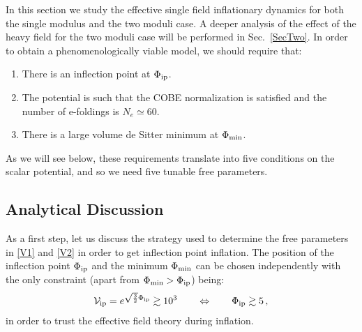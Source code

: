 \documentclass[12pt,a4paper]{book}
\newcommand{\ben}{\begin{enumerate}}
\newcommand{\een}{\end{enumerate}}
\newcommand\vo{{\mathcal{V}}}
\begin{document}
In this section we study the effective single field inflationary dynamics for both the single modulus and the two moduli case. A deeper analysis of the effect of the heavy field for the two moduli case will be performed in Sec.~\ref{SecTwo}. In order to obtain a phenomenologically viable model, we should require that:
\ben
\item There is an inflection point at $\Phi_{\rm ip}$.
\item The potential is such that the COBE normalization is satisfied and the number of e-foldings is $N_e \simeq 60$.
\item There is a large volume de Sitter minimum at $\Phi_{\rm min}$.
\een
As we will see below, these requirements translate into five conditions on the scalar potential, and so we need five tunable free parameters.


\subsection{Analytical Discussion}

As a first step, let us discuss the strategy used to determine the free parameters in \eqref{V1} and \eqref{V2} in order to get inflection point inflation. The position of the inflection point $\Phi_{\rm ip}$ and the minimum $\Phi_{\rm min}$ can be chosen independently with the only constraint (apart from $\Phi_{\rm min}>\Phi_{\rm ip}$) being:
\begin{align}
\vo_{\rm ip} = e^{\sqrt{\frac{3}{2}} \Phi_{\rm ip}} \gtrsim 10^3\qquad\Leftrightarrow\qquad\Phi_{\rm ip} \gtrsim 5\,,
\end{align}
in order to trust the effective field theory during inflation.\\
\end{document}
